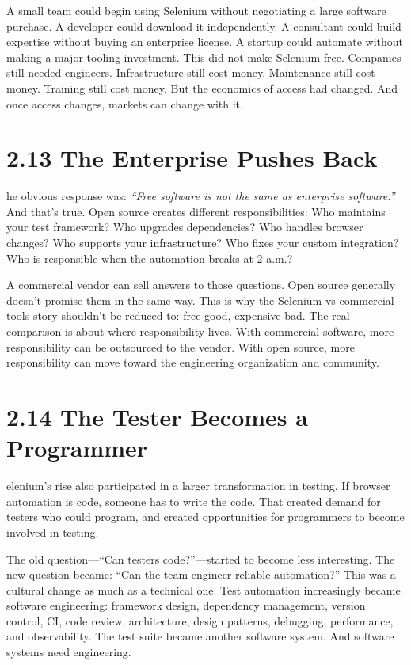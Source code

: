 \documentclass[11pt, a4paper, openany]{book}
\newcommand{\initialcap}[1]{{\fontfamily{lmss}\selectfont\huge\textbf{#1}}}
\begin{document}
A small team could begin using Selenium without negotiating a large software purchase. A developer could download it independently. A consultant could build expertise without buying an enterprise license. A startup could automate without making a major tooling investment. This did not make Selenium free. Companies still needed engineers. Infrastructure still cost money. Maintenance still cost money. Training still cost money. But the economics of access had changed. And once access changes, markets can change with it.

\section{2.13 The Enterprise Pushes Back}
\noindent \initialcap{T}he obvious response was: \textit{``Free software is not the same as enterprise software.''} And that's true. Open source creates different responsibilities: Who maintains your test framework? Who upgrades dependencies? Who handles browser changes? Who supports your infrastructure? Who fixes your custom integration? Who is responsible when the automation breaks at 2 a.m.?

A commercial vendor can sell answers to those questions. Open source generally doesn't promise them in the same way. This is why the Selenium-vs-commercial-tools story shouldn't be reduced to: free good, expensive bad. The real comparison is about where responsibility lives. With commercial software, more responsibility can be outsourced to the vendor. With open source, more responsibility can move toward the engineering organization and community.

\section{2.14 The Tester Becomes a Programmer}
\noindent \initialcap{S}elenium's rise also participated in a larger transformation in testing. If browser automation is code, someone has to write the code. That created demand for testers who could program, and created opportunities for programmers to become involved in testing.

The old question---``Can testers code?''---started to become less interesting. The new question became: ``Can the team engineer reliable automation?'' This was a cultural change as much as a technical one. Test automation increasingly became software engineering: framework design, dependency management, version control, CI, code review, architecture, design patterns, debugging, performance, and observability. The test suite became another software system. And software systems need engineering.
\end{document}
